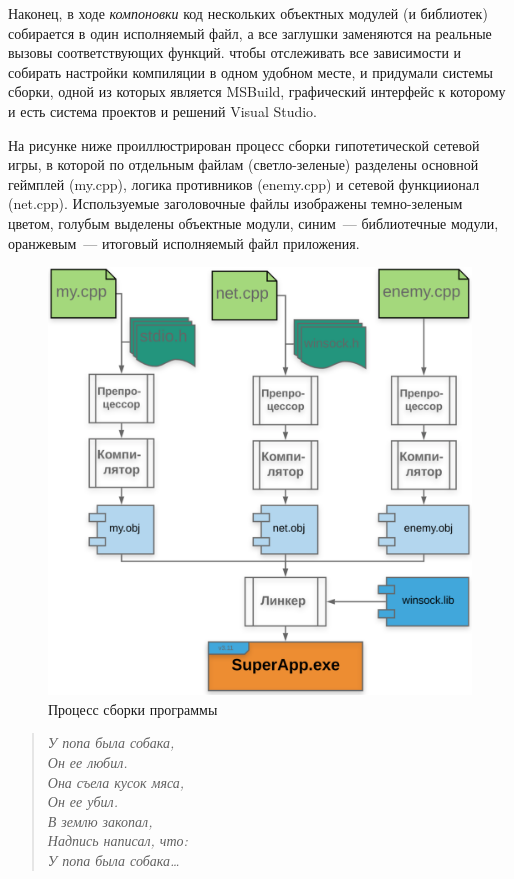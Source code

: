 \documentclass{article}
\begin{document}
Наконец, в ходе \emph{компоновки} код нескольких объектных модулей (и библиотек) собирается в один исполняемый файл, а все заглушки заменяются на реальные вызовы соответствующих функций. чтобы отслеживать все зависимости и собирать настройки компиляции в одном удобном месте, и придумали системы сборки, одной из которых является MSBuild, графический интерфейс к которому и есть система проектов и решений Visual Studio.

На рисунке ниже проиллюстрирован процесс сборки гипотетической сетевой игры, в которой по отдельным файлам (светло-зеленые) разделены основной геймплей (my.cpp), логика противников (enemy.cpp) и сетевой функциионал (net.cpp). Используемые заголовочные файлы изображены темно-зеленым цветом, голубым выделены объектные модули, синим~--- библиотечные модули, оранжевым~--- итоговый исполняемый файл приложения. 


\begin{figure}
\includegraphics[scale=0.5]{link.png}
\caption{Процесс сборки программы}
\end{figure}


\newpage
\begin{verse}
\small\it
У попа была собака,\\
Он ее любил.\\
Она съела кусок мяса,\\
Он ее убил.\\
В землю закопал, \\
Надпись написал, что:\\
У попа была собака\ldots
\end{verse}
\end{document}
